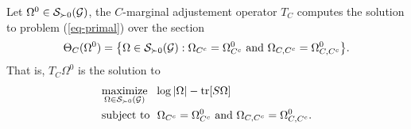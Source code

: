 \begin{lemma}
    Let $\Omega^0 \in {\mathcal{S}}_{\succ 0}({\mathcal{G}})$, the $C$-marginal adjustement operator $T_C$ computes the solution to problem (\ref{eq-primal}) over the section 
    \begin{equation*}
        \Theta_C(\Omega^0) = {\left\{ \Omega \in {\mathcal{S}}_{\succ 0}({\mathcal{G}}) : \Omega_{C^c} = \Omega^0_{C^c} {\textrm{ and }} \Omega_{C, C^c} = \Omega^0_{C, C^c} \right\}}.
    \end{equation*}
    That is, $T_C \Omega^0$ is the solution to
    \begin{align} \label{eq-sub-optim}
        \begin{split}
            &\underset{\Omega \in \S_{\succ 0}(\G)}{\t{maximize}}\ \  \log |\Omega| - \tr[S\Omega]\\
            &\t{subject to}\ \ \Omega_{C^c} = \Omega^0_{C^c} \t{ and } \Omega_{C, C^c} = \Omega^0_{C, C^c}.
        \end{split}
    \end{align}
\end{lemma}
